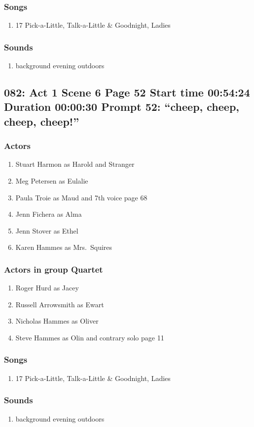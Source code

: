 \subsubsection{Songs}
\begin{enumerate}
\item 17 Pick-a-Little, Talk-a-Little \& Goodnight, Ladies
\end{enumerate}\subsubsection{Sounds}
\begin{enumerate}
\item background evening outdoors
\end{enumerate}
\subsection{082: Act 1 Scene 6 Page 52 Start time 00:54:24 Duration 00:00:30 Prompt 52: ``cheep, cheep, cheep, cheep!''}

\subsubsection{Actors}
\begin{enumerate}
\item Stuart Harmon as Harold and Stranger
\item Meg Petersen as Eulalie
\item Paula Troie as Maud and 7th voice page 68
\item Jenn Fichera as Alma
\item Jenn Stover as Ethel
\item Karen Hammes as Mrs.~Squires
\end{enumerate}
\subsubsection{Actors in group Quartet}
\begin{enumerate}
\item Roger Hurd as Jacey
\item Russell Arrowsmith as Ewart
\item Nicholas Hammes as Oliver
\item Steve Hammes as Olin and contrary solo page 11
\end{enumerate}

\subsubsection{Songs}
\begin{enumerate}
\item 17 Pick-a-Little, Talk-a-Little \& Goodnight, Ladies
\end{enumerate}\subsubsection{Sounds}
\begin{enumerate}
\item background evening outdoors
\end{enumerate}
